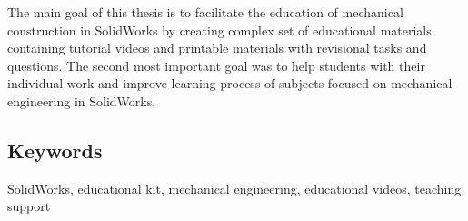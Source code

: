 \documentclass{template/socthesis}
\begin{document}
The main goal of this thesis is to facilitate the education of mechanical construction in SolidWorks by creating complex set of educational materials containing tutorial videos and printable materials with revisional tasks and questions.
The second most important goal was to help students with their individual work and improve learning process of subjects focused on mechanical engineering in SolidWorks. 

\subsection*{Keywords}
SolidWorks, educational kit, mechanical engineering, educational videos, teaching support


\newpage
\pagestyle{plain}

\setlength{\parskip}{0em}
\tableofcontents %

\setlength{\parskip}{0.8em}
\setcounter{figure}{0}
\setcounter{table}{0}
\newpage







\newpage

\appendix
{}



\setlength{\parskip}{0em}
\printbibliography[title=Literatura]

\listoffigures \label{listoffigures}

\end{document}
